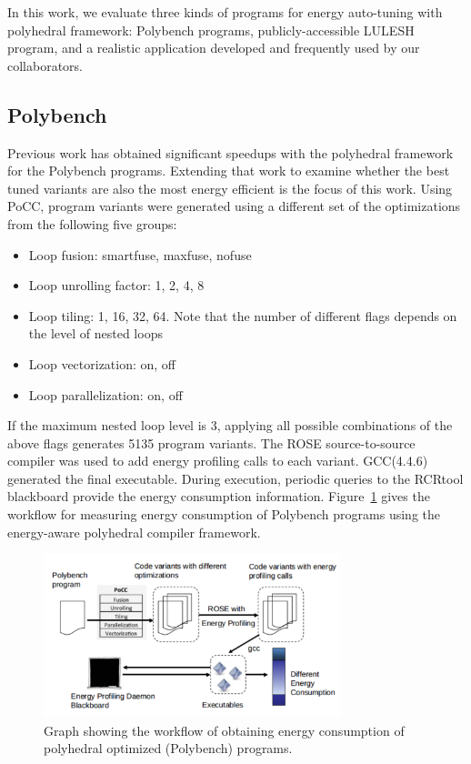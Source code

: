 In this work, we evaluate three kinds of programs for energy auto-tuning with
polyhedral framework: Polybench programs, publicly-accessible LULESH 
program\cite{LULESH:versions}, and a realistic application developed and frequently 
used by our collaborators.

\subsection{Polybench}
Previous work has obtained significant speedups with the 
polyhedral framework for the Polybench programs\cite{EJ2011,EJ2012,EJ2013}.
Extending that work to examine whether the best tuned variants are also
the most energy efficient is the focus of this work.
Using PoCC, program variants were generated using
a different set of the 
optimizations from the following five groups: 
\begin{itemize}
    \item Loop fusion: smartfuse, maxfuse, nofuse
    \item Loop unrolling factor: 1, 2, 4, 8
    \item Loop tiling: 1, 16, 32, 64. Note that the number of different flags
 depends on the level of nested loops   
    \item Loop vectorization: on, off
    \item Loop parallelization: on, off
\end{itemize}
If the maximum nested loop level is 3, applying all possible combinations
of the above flags generates 5135 program variants. The ROSE source-to-source
compiler was used to add energy profiling calls to each variant.
GCC(4.4.6) generated the final executable. During execution,
 periodic queries to the RCRtool blackboard provide the energy consumption information.
Figure~\ref{fig:Workflow} gives the workflow for measuring energy consumption of 
Polybench programs using the energy-aware polyhedral compiler framework.

\begin{figure}[t]
    \includegraphics[width=3.4in]{workflow}
    \caption{Graph showing the workflow of obtaining energy consumption of polyhedral
optimized (Polybench) programs. }
    \label{fig:Workflow}
\end{figure}

